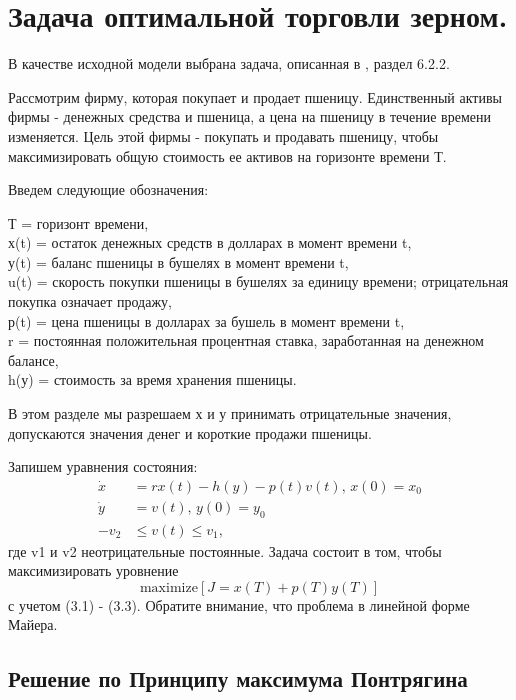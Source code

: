 \section{Задача оптимальной торговли зерном.}

В качестве исходной модели выбрана задача, описанная в \cite{sethi_optimal_2000}, раздел 6.2.2.

Рассмотрим фирму, которая покупает и продает пшеницу. Единственный активы фирмы - денежных средства и пшеница, а цена на пшеницу в течение времени изменяется. Цель этой фирмы - покупать и продавать пшеницу, чтобы максимизировать общую стоимость ее активов на горизонте времени Т.  

Введем следующие обозначения:
 
{Т} = горизонт времени,\\
{х(t)} = остаток денежных средств в долларах в момент времени t,\\
{у(t)} = баланс пшеницы в бушелях в момент времени t,\\ 
{u(t)} = скорость покупки пшеницы в бушелях за единицу времени; отрицательная покупка означает продажу,\\
{р(t)} = цена пшеницы в долларах за бушель в момент времени t,\\
{r} = постоянная положительная процентная ставка, заработанная на денежном балансе,\\
{h(у)} = стоимость за время хранения пшеницы.
 
В этом разделе мы разрешаем {х} и {у} принимать отрицательные значения, допускаются значения денег и короткие продажи пшеницы.



Запишем уравнения состояния:
\begin{align}
    \Dot{x} & = r x(t) - h(y) - p(t) v(t),\, x(0) = x_{0} \\
    \Dot{y} & = v(t), \, y(0) = y_{0} \\
    - v_2 & \le v(t) \le v_1,
\end{align}    
где {v1} и {v2} неотрицательные постоянные. Задача состоит в том, чтобы максимизировать уровнение
\[
  \mathrm{maximize} [J = x(T) + p(T) y(T)]
\]
с учетом (3.1) - (3.3). Обратите внимание, что проблема в линейной форме Майера.

\subsection{Решение по Принципу максимума Понтрягина}

